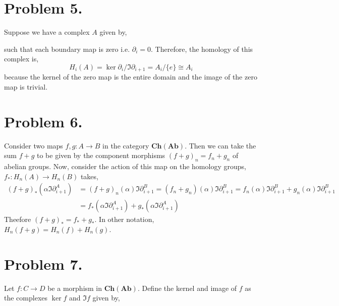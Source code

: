\documentclass[12pt]{extarticle}
\newcommand{\abchains}{\mathbf{Ch(Ab)}}
\begin{document}
\section*{Problem 5.}
Suppose we have a complex $A$ given by,
\begin{center}
\end{center}
such that each boundary map is zero i.e. $\partial_i = 0$. Therefore, the homology of this complex is,
\[ H_i(A) = \ker{\partial_i}/\Im{\partial_{i+1}}  = A_i / \{e\} \cong A_i \]
because the kernel of the zero map is the entire domain and the image of the zero map is trivial. 

\section*{Problem 6.}

Consider two maps $f, g : A \to B$ in the category $\abchains$. Then we can take the sum $f + g$ to be given by the component morphisms $(f + g)_n = f_n + g_n$ of abelian groups. Now, consider the action of this map on the homology groups, $ f_* : H_n(A) \to H_n(B) $ takes,
\begin{align*}
(f+g)_*(\alpha \Im{\partial_{i+1}^A}) & = (f+g)_n(\alpha) \Im{\partial_{i+1}^B} = (f_n+g_n)(\alpha) \Im{\partial_{i+1}^B} = f_n(\alpha) \Im{\partial_{i+1}^B} + g_n(\alpha)  \Im{\partial_{i+1}^B}
\\ & = f_*(\alpha \Im{\partial_{i+1}^A}) + g_*(\alpha \Im{\partial_{i+1}^A}) 
\end{align*}
Theefore $(f + g)_* = f_* + g_*$. In other notation, $H_n(f + g) = H_n(f) + H_n(g)$. 

\section*{Problem 7.}

Let $f : C \to D$ be a morphism in $\abchains$. Define the kernel and image of $f$ as the complexes $\ker{f}$ and $\Im{f}$ given by, 
\end{document}
